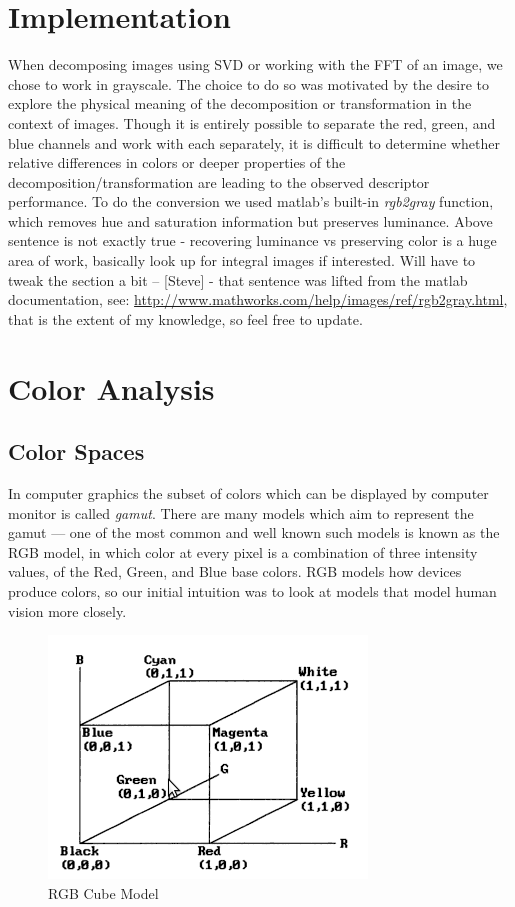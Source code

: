 \documentclass{report}
\begin{document}
\section{Implementation}

When decomposing images using SVD or working with the FFT of an image, we chose to work in grayscale. The choice to do so was motivated by the desire to explore the physical meaning of the decomposition or transformation in the context of images. Though it is entirely possible to separate the red, green, and blue channels and work with each separately, it is difficult to determine whether relative differences in colors or deeper properties of the decomposition/transformation are leading to the observed descriptor performance. To do the conversion we used matlab's built-in \textit{rgb2gray} function, which removes hue and saturation information but preserves luminance. {\color{red} Above sentence is not exactly true - recovering luminance vs preserving color is a huge area of work, basically look up for integral images if interested. Will have to tweak the section a bit -- [Steve] - that sentence was lifted from the matlab documentation, see: \url{http://www.mathworks.com/help/images/ref/rgb2gray.html}, that is the extent of my knowledge, so feel free to update.}

\section{Color Analysis}
\label{sec:color}
\subsection{Color Spaces}
\label{sec:colorSpaces}
In computer graphics the subset of colors which can be displayed by computer monitor is called \emph{gamut}\cite{color_model_ref}. There are many models which aim to represent the gamut --- one of the most common and well known such models is known as the RGB model, in which color at every pixel is a combination of three intensity values, of the Red, Green, and Blue base colors. RGB models how devices produce colors, so our initial intuition was to look at models that model human vision more closely.  
\begin{figure}[hbtp]
\centering
\includegraphics[scale=0.5]{graphics/rgb_cube.png}
\caption{RGB Cube Model}
\end{figure}
\end{document}
